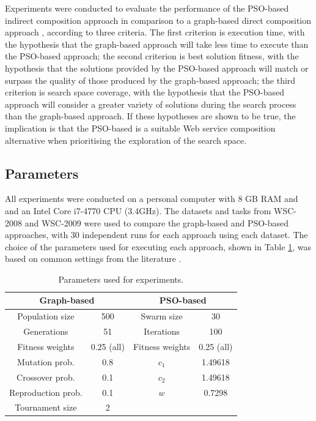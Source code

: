 \documentclass{llncs}
\begin{document}
Experiments were conducted to evaluate the performance of the PSO-based indirect composition approach in comparison to a graph-based direct composition approach \cite{da2015graphevol}, according to three criteria. The first criterion is execution time, with the hypothesis that the graph-based approach will take less time to execute than the PSO-based approach; the second criterion is best solution fitness, with the hypothesis that the solutions provided by the PSO-based approach will match or surpass the quality of those produced by the graph-based approach; the third criterion is search space coverage, with the hypothesis that the PSO-based approach will consider a greater variety of solutions during the search process than the graph-based approach. If these hypotheses are shown to be true, the implication is that the PSO-based is a suitable Web service composition alternative when prioritising the exploration of the search space.

\subsection{Parameters}

All experiments were conducted on a personal computer with 8 GB RAM and and an Intel Core i7-4770 CPU (3.4GHz). The datasets and tasks from WSC-2008 \cite{bansal2008wsc} and WSC-2009 \cite{kona2009wsc} were used to compare the graph-based and PSO-based approaches, with 30 independent runs for each approach using each dataset. The choice of the parameters used for executing each approach, shown in Table \ref{tab:parameters}, was based on common settings from the literature \cite{koza1992genetic,eberhart2001particle}.

\begin{table}[h]
\centering
\caption{Parameters used for experiments.}
\label{tab:parameters}
\begin{tabular}{|c|c|c|c|}
\hline
\multicolumn{2}{|c|}{{\bf Graph-based}} & \multicolumn{2}{c|}{{\bf PSO-based}} \\ \hline
Population size        & 500            & Swarm size          & 30             \\ \hline
Generations            & 51             & Iterations          & 100            \\ \hline
Fitness weights        & 0.25 (all)     & Fitness weights     & 0.25 (all)     \\ \hline
Mutation prob.         & 0.8            & $c_1$               & 1.49618        \\ \hline
Crossover prob.        & 0.1            & $c_2$               & 1.49618        \\ \hline
Reproduction prob.     & 0.1            & $w$                 & 0.7298         \\ \hline
Tournament size        & 2              &                     &                \\ \hline
\end{tabular}
\end{table}
\end{document}
